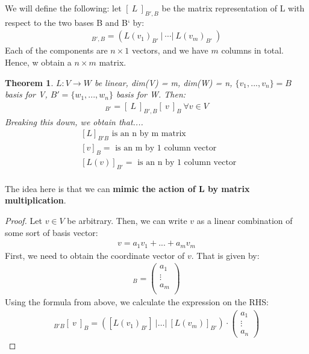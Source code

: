 \documentclass[a4paper, 12pt]{article}
\newtheorem{theorem}{Theorem}
\theoremstyle{definition}
\theoremstyle{definition}
\theoremstyle{definition}
\theoremstyle{definition}
\begin{document}
{\newline
We will define the following: let $[\ L\ ]_{B',B}$ be the matrix representation of L with respect to the two bases B and B` by: 
\begin{align*}
	[\ L\ ]_{B', B} = ( L(v_1)_{B'}\ |\ \cdots |\ L(v_m)_{B'}\ ) 
\end{align*}
Each of the components are $n \times 1$ vectors, and we have $m$ columns in total. Hence, w obtain a $n \times m$ matrix. 
\begin{theorem}
	$L: V \rightarrow W$ be linear, dim(V) = m, dim(W) = n, $\{ v_1, ..., v_n\} = B$ basis for V, $B' = \{ w_1, ..., w_n \}$ basis for W. Then: 
	\begin{align*}
		[\L(v)\ ]_{B'} = [\ L\ ]_{B', B} [\ v\ ]_B\ \forall v \in V
	\end{align*}
	Breaking this down, we obtain that....
	\begin{align*}
		& [L]_{B' B} \mbox{ is an n by m matrix}\\
		& [v]_B = \mbox{ is an m by 1 column vector}\\
		& [L(v)]_{B'} = \mbox{ is an n by 1 column vector }\\
	\end{align*}
\end{theorem}
The idea here is that we can \textbf{mimic the action of L by matrix multiplication}. 
\begin{proof}
	Let $v \in V$ be arbitrary. Then, we can write $v$ as a linear combination of some sort of basis vector: 
	\begin{align*}
		v = a_1 v_1 + ... + a_m v_m 
	\end{align*}
	First, we need to obtain the coordinate vector of $v$. That is given by:
	\begin{align*}
		[\ v\ ]_B = \begin{pmatrix}
			a_1 \\
			\vdots \\
			a_m \\
		\end{pmatrix}
	\end{align*}
	Using the formula from above, we calculate the expression on the RHS: 
	\begin{align*}
		[\ L\ ]_{B'B} [\ v\ ]_B = ([L(v_1)_{B'}]\ | \hdots |\ [L(v_m)]_{B'}) \cdot \begin{pmatrix}
			a_1 \\
			\vdots \\
			a_n 
		\end{pmatrix}
	\end{align*} 

\end{proof}}
\end{document}
